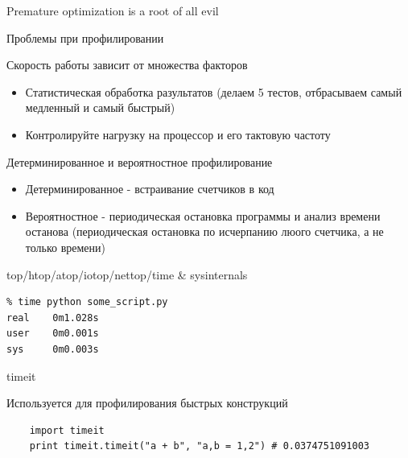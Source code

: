 \documentclass{article}
\begin{document}
\LARGE

\begin{center} Premature optimization is a root of all evil \end{center}
\newpage

\begin{center} Проблемы при профилировании \end{center}
Скорость работы зависит от множества факторов
\begin{itemize}
    \item Статистическая обработка разультатов (делаем 5 тестов, отбрасываем самый медленный и самый быстрый)
    \item Контролируйте нагрузку на процессор и его тактовую частоту
\end{itemize}
\newpage

\begin{center} Детерминированное и вероятностное профилирование \end{center}
\begin{itemize}
    \item Детерминированное - встраивание счетчиков в код
    \item Вероятностное - периодическая остановка программы и анализ времени останова
    (периодическая остановка по исчерпанию люого счетчика, а не только времени)
\end{itemize}
\newpage

\begin{center} top/htop/atop/iotop/nettop/time \& sysinternals \end{center}
\begin{verbatim}
% time python some_script.py
real    0m1.028s
user    0m0.001s
sys     0m0.003s
\end{verbatim}
\newpage

\begin{center} timeit \end{center}
Используется для профилирования быстрых конструкций
\begin{lstlisting}
    import timeit
    print timeit.timeit("a + b", "a,b = 1,2") # 0.0374751091003
\end{lstlisting}
\newpage
\end{document}
